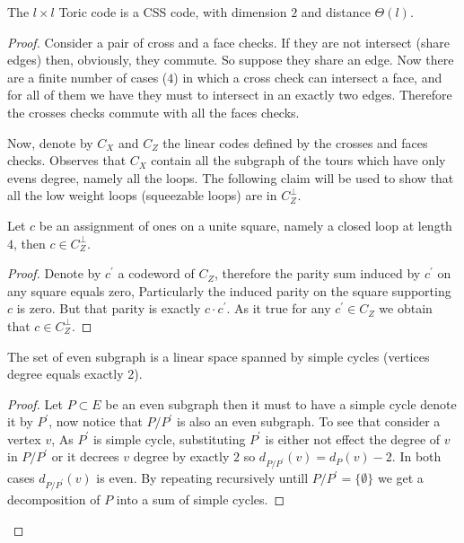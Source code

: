 \begin{claim}
  The $l \times l$  Toric code is a CSS code, with dimension $2$ and distance $\Theta\left( l \right)$.   
\end{claim}
\begin{proof}
  Consider a pair of cross and a face checks. If they are not intersect (share edges) then, obviously, they commute. So suppose they share an edge. Now there are a finite number of cases ($4$) in which a cross check can intersect a face, and for all of them we have they must to intersect in an exactly two edges. Therefore the crosses checks commute with all the faces checks. 

  Now, denote by $C_{X}$ and $C_{Z}$ the linear codes defined by the crosses and faces checks. Observes that $C_{X}$ contain all the subgraph of the tours which have only evens degree, namely all the loops. The following claim will be used to show that all the low weight loops (squeezable loops) are in $C_{Z}^{\perp}$. 
  \begin{claim}
    Let $c$ be an assignment of ones on a unite square, namely a closed loop at length $4$, then $c \in C_{Z}^{\perp}$.  
  \end{claim}
  \begin{proof}
    Denote by $c^{\prime}$ a codeword of $C_{Z}$, therefore the parity sum induced by $c^{\prime}$ on any square equals zero, Particularly the induced parity on the square supporting $c$ is zero. But that parity is exactly $c\cdot c^{\prime}$. As it true for any $c^{\prime} \in C_{Z}$ we obtain that $c \in C_{Z}^{\perp}$.  
  \end{proof}
  \begin{claim}
    The set of even subgraph is a linear space spanned by simple cycles (vertices degree equals exactly 2).
  \end{claim}
  \begin{proof}
    Let $P \subset E$ be an even subgraph then it must to have a simple cycle denote it by $P^{\prime}$, now notice that $P/P^\prime$ is also an even subgraph. To see that consider a vertex $v$, As $P^{\prime}$ is simple cycle, substituting $P^{\prime}$ is either not effect the degree of $v$ in $P/P^{\prime}$ or it decrees $v$ degree by exactly $2$ so $d_{P/P^{\prime}}\left( v \right) = d_{P}\left( v \right) - 2$. In both cases $d_{P/P^{\prime}}\left( v \right)$ is even.
    By repeating recursively untill $P/P^{\prime} = \{ \emptyset \}$ we get a decomposition of $P$ into a sum of simple cycles.   
  \end{proof}


\end{proof}
